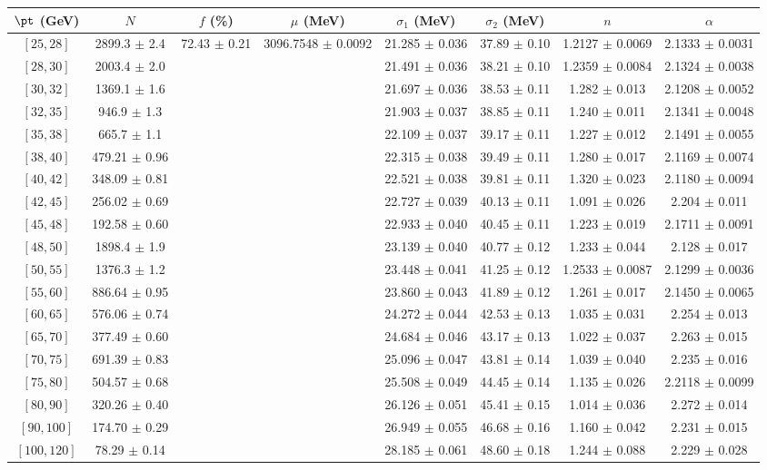 \begin{tabular}{c||c|c|c|c|c|c|c}
$\pt$ (GeV) & $N$ & $f$ (\%) & $\mu$ (MeV) & $\sigma_1$ (MeV) & $\sigma_2$ (MeV) & $n$ & $\alpha$ \\
\hline
$[25, 28]$ & 2899.3 $\pm$ 2.4 & \multirow{19}{*}{72.43 $\pm$ 0.21} & \multirow{19}{*}{3096.7548 $\pm$ 0.0092} & 21.285 $\pm$ 0.036 & 37.89 $\pm$ 0.10 & 1.2127 $\pm$ 0.0069 & 2.1333 $\pm$ 0.0031\\
$[28, 30]$ & 2003.4 $\pm$ 2.0 &  &  & 21.491 $\pm$ 0.036 & 38.21 $\pm$ 0.10 & 1.2359 $\pm$ 0.0084 & 2.1324 $\pm$ 0.0038\\
$[30, 32]$ & 1369.1 $\pm$ 1.6 &  &  & 21.697 $\pm$ 0.036 & 38.53 $\pm$ 0.11 & 1.282 $\pm$ 0.013 & 2.1208 $\pm$ 0.0052\\
$[32, 35]$ & 946.9 $\pm$ 1.3 &  &  & 21.903 $\pm$ 0.037 & 38.85 $\pm$ 0.11 & 1.240 $\pm$ 0.011 & 2.1341 $\pm$ 0.0048\\
$[35, 38]$ & 665.7 $\pm$ 1.1 &  &  & 22.109 $\pm$ 0.037 & 39.17 $\pm$ 0.11 & 1.227 $\pm$ 0.012 & 2.1491 $\pm$ 0.0055\\
$[38, 40]$ & 479.21 $\pm$ 0.96 &  &  & 22.315 $\pm$ 0.038 & 39.49 $\pm$ 0.11 & 1.280 $\pm$ 0.017 & 2.1169 $\pm$ 0.0074\\
$[40, 42]$ & 348.09 $\pm$ 0.81 &  &  & 22.521 $\pm$ 0.038 & 39.81 $\pm$ 0.11 & 1.320 $\pm$ 0.023 & 2.1180 $\pm$ 0.0094\\
$[42, 45]$ & 256.02 $\pm$ 0.69 &  &  & 22.727 $\pm$ 0.039 & 40.13 $\pm$ 0.11 & 1.091 $\pm$ 0.026 & 2.204 $\pm$ 0.011\\
$[45, 48]$ & 192.58 $\pm$ 0.60 &  &  & 22.933 $\pm$ 0.040 & 40.45 $\pm$ 0.11 & 1.223 $\pm$ 0.019 & 2.1711 $\pm$ 0.0091\\
$[48, 50]$ & 1898.4 $\pm$ 1.9 &  &  & 23.139 $\pm$ 0.040 & 40.77 $\pm$ 0.12 & 1.233 $\pm$ 0.044 & 2.128 $\pm$ 0.017\\
$[50, 55]$ & 1376.3 $\pm$ 1.2 &  &  & 23.448 $\pm$ 0.041 & 41.25 $\pm$ 0.12 & 1.2533 $\pm$ 0.0087 & 2.1299 $\pm$ 0.0036\\
$[55, 60]$ & 886.64 $\pm$ 0.95 &  &  & 23.860 $\pm$ 0.043 & 41.89 $\pm$ 0.12 & 1.261 $\pm$ 0.017 & 2.1450 $\pm$ 0.0065\\
$[60, 65]$ & 576.06 $\pm$ 0.74 &  &  & 24.272 $\pm$ 0.044 & 42.53 $\pm$ 0.13 & 1.035 $\pm$ 0.031 & 2.254 $\pm$ 0.013\\
$[65, 70]$ & 377.49 $\pm$ 0.60 &  &  & 24.684 $\pm$ 0.046 & 43.17 $\pm$ 0.13 & 1.022 $\pm$ 0.037 & 2.263 $\pm$ 0.015\\
$[70, 75]$ & 691.39 $\pm$ 0.83 &  &  & 25.096 $\pm$ 0.047 & 43.81 $\pm$ 0.14 & 1.039 $\pm$ 0.040 & 2.235 $\pm$ 0.016\\
$[75, 80]$ & 504.57 $\pm$ 0.68 &  &  & 25.508 $\pm$ 0.049 & 44.45 $\pm$ 0.14 & 1.135 $\pm$ 0.026 & 2.2118 $\pm$ 0.0099\\
$[80, 90]$ & 320.26 $\pm$ 0.40 &  &  & 26.126 $\pm$ 0.051 & 45.41 $\pm$ 0.15 & 1.014 $\pm$ 0.036 & 2.272 $\pm$ 0.014\\
$[90, 100]$ & 174.70 $\pm$ 0.29 &  &  & 26.949 $\pm$ 0.055 & 46.68 $\pm$ 0.16 & 1.160 $\pm$ 0.042 & 2.231 $\pm$ 0.015\\
$[100, 120]$ & 78.29 $\pm$ 0.14 &  &  & 28.185 $\pm$ 0.061 & 48.60 $\pm$ 0.18 & 1.244 $\pm$ 0.088 & 2.229 $\pm$ 0.028\\
\end{tabular}

